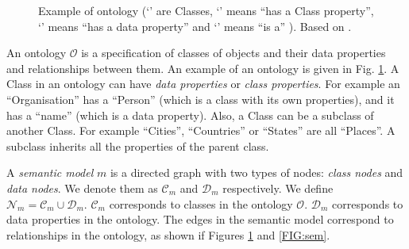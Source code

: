 \documentclass[letterpaper]{article} %
\begin{document}
\begin{figure}[ht]
\caption{Example of ontology
(`' are Classes, `' means ``has a Class property'', 
`' 
means ``has 
a data 
property'' and 
`' means ``is a'' ). Based on 
\cite{Taheriyan2013}.
}
\label{FIG:onto}
\end{figure}




An ontology $\mathcal{O}$ is a specification of classes of objects and their 
data properties and relationships between them. An example of an ontology is 
given 
in Fig. \ref{FIG:onto}. A Class in an ontology can have \emph{data properties} 
or 
\emph{class properties}. For example an ``Organisation'' has a ``Person'' 
(which is a class with its own properties), and it has a ``name'' (which 
is a data property). Also, a Class can be a subclass of another Class. For 
example ``Cities'', ``Countries'' or ``States'' are all ``Places''. A subclass 
inherits all the properties of the parent class.

A \emph{semantic model} $m$ is a directed graph with two types of nodes: 
\emph{class nodes} and \emph{data nodes}. We denote them as $\mathcal{C}_m$ and 
$\mathcal{D}_m$ respectively. We define $\mathcal{N}_m = \mathcal{C}_m \cup 
\mathcal{D}_m$. $ \mathcal{C}_m$ corresponds to classes in the ontology 
$\mathcal{O}$. $\mathcal{D}_m$ corresponds to data 
properties in the ontology. The edges in the semantic model correspond to 
relationships in the ontology, as shown if Figures \ref{FIG:onto} and 
\ref{FIG:sem}.
\end{document}
